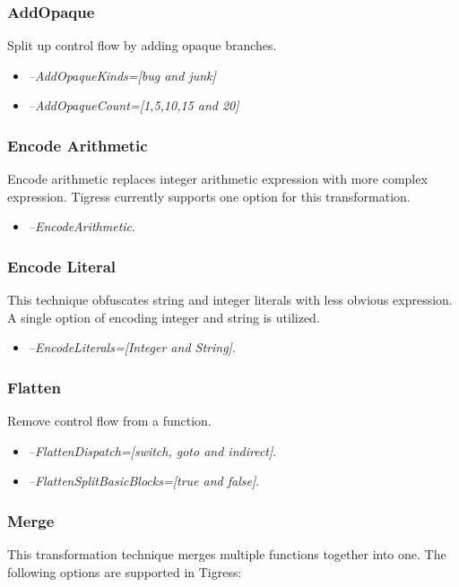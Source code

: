 \subsubsection{AddOpaque}
Split up control flow by adding opaque branches.

\begin{itemize}
\item \textit{--AddOpaqueKinds=[bug and junk]}
\item \textit{--AddOpaqueCount=[1,5,10,15 and 20]}
\end{itemize}


\subsubsection{Encode Arithmetic}
Encode arithmetic replaces integer arithmetic expression with more complex expression. Tigress currently supports one option for this transformation.

\begin{itemize}
\item \textit{--EncodeArithmetic}.
\end{itemize}


\subsubsection{Encode Literal}
This technique obfuscates string and integer literals with less obvious expression. A single option of encoding integer and string is utilized.

\begin{itemize}
\item \textit{--EncodeLiterals=[Integer and String]}.
\end{itemize}

\subsubsection{Flatten}
Remove control flow from a function.

\begin{itemize}
\item \textit{--FlattenDispatch=[switch, goto and indirect]}.
\item \textit{--FlattenSplitBasicBlocks=[true and false]}.
\end{itemize}



\subsubsection{Merge}
This transformation technique merges multiple functions together into one. The following options are supported in Tigress: 

